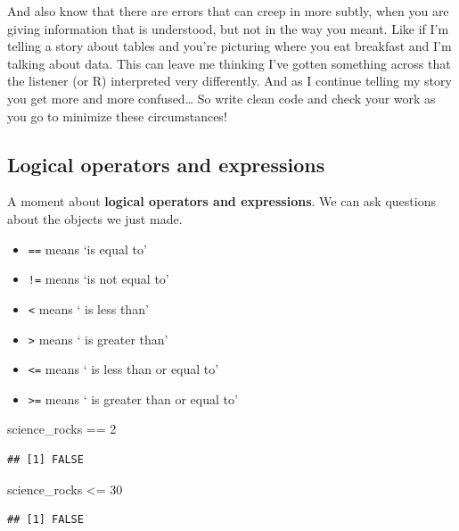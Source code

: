 \documentclass[]{book}
\newenvironment{Shaded}{\begin{snugshade}}{\end{snugshade}}
\newcommand{\DecValTok}[1]{\textcolor[rgb]{0.00,0.00,0.81}{{#1}}}
\newcommand{\StringTok}[1]{\textcolor[rgb]{0.31,0.60,0.02}{{#1}}}
\newcommand{\NormalTok}[1]{{#1}}
\providecommand{\tightlist}{%
  \setlength{\itemsep}{0pt}\setlength{\parskip}{0pt}}
\theoremstyle{definition}
\theoremstyle{definition}
\theoremstyle{definition}
\theoremstyle{remark}
\begin{document}
And also know that there are errors that can creep in more subtly, when
you are giving information that is understood, but not in the way you
meant. Like if I'm telling a story about tables and you're picturing
where you eat breakfast and I'm talking about data. This can leave me
thinking I've gotten something across that the listener (or R)
interpreted very differently. And as I continue telling my story you get
more and more confused\ldots{} So write clean code and check your work
as you go to minimize these circumstances!

\subsection{Logical operators and
expressions}\label{logical-operators-and-expressions}

A moment about \textbf{logical operators and expressions}. We can ask
questions about the objects we just made.

\begin{itemize}
\tightlist
\item
  \texttt{==} means `is equal to'
\item
  \texttt{!=} means `is not equal to'
\item
  \texttt{\textless{}} means ` is less than'
\item
  \texttt{\textgreater{}} means ` is greater than'
\item
  \texttt{\textless{}=} means ` is less than or equal to'
\item
  \texttt{\textgreater{}=} means ` is greater than or equal to'
\end{itemize}

\begin{Shaded}
\begin{Highlighting}[]
\NormalTok{science_rocks ==}\StringTok{ }\DecValTok{2}
\end{Highlighting}
\end{Shaded}

\begin{verbatim}
## [1] FALSE
\end{verbatim}

\begin{Shaded}
\begin{Highlighting}[]
\NormalTok{science_rocks <=}\StringTok{ }\DecValTok{30}
\end{Highlighting}
\end{Shaded}

\begin{verbatim}
## [1] FALSE
\end{verbatim}
\end{document}
